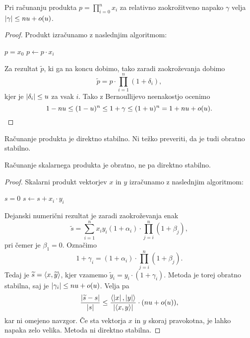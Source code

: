 \begin{trditev}
Pri računanju produkta $p = \prod_{i=0}^n x_i$ za relativno
zaokrožitveno napako $\gamma$ velja $\left\lvert \gamma\right\rvert \leq nu + o(u)$.
\end{trditev}

\begin{proof}
Produkt izračunamo z naslednjim algoritmom:
\begin{algorithmic}[1]
\State $p = x_0$
  \State $p \gets p \cdot x_i$
\EndFor
\end{algorithmic}
Za rezultat $\widetilde{p}$, ki ga na koncu dobimo, tako zaradi
zaokroževanja dobimo
\[
\widetilde{p} = p \cdot \prod_{i=1}^n (1+\delta_i),
\]
kjer je $\left\lvert \delta_i\right\rvert \leq u$ za vsak $i$. Tako z Bernoullijevo
neenakostjo ocenimo
\[
1 - nu \leq (1-u)^n \leq 1 + \gamma \leq (1+u)^n = 1 + nu + o(u).
\qedhere
\]
\end{proof}

\begin{opomba}
Računanje produkta je direktno stabilno. Ni težko preveriti, da je
tudi obratno stabilno.
\end{opomba}

\begin{trditev}
Računanje skalarnega produkta je obratno, ne pa direktno stabilno.
\end{trditev}

\begin{proof}
Skalarni produkt vektorjev $x$ in $y$ izračunamo z naslednjim
algoritmom:
\begin{algorithmic}[1]
\State $s = 0$
  \State $s \gets s + x_i \cdot y_i$
\EndFor
\end{algorithmic}
Dejanski numerični rezultat je zaradi zaokroževanja enak
\[
\widetilde{s} = \sum_{i=1}^n x_i y_i (1 + \alpha_i) \cdot
\prod_{j=i}^n (1 + \beta_j),
\]
pri čemer je $\beta_1 = 0$. Označimo
\[
1 + \gamma_i = (1 + \alpha_i) \cdot \prod_{j=i}^n (1 + \beta_j).
\]
Tedaj je $\widetilde{s} = \left\langle x, \widetilde{y}\right\rangle$, kjer vzamemo
$\widetilde{y}_i = y_i \cdot (1 + \gamma_i)$. Metoda je torej
obratno stabilna, saj je $\left\lvert \gamma_i\right\rvert \leq nu + o(u)$. Velja pa
\[
\frac{\left\lvert \widetilde{s} - s\right\rvert}{\left\lvert s\right\rvert} \leq
\frac{\left\langle \left\lvert x\right\rvert, \left\lvert y\right\rvert\right\rangle}{\left\lvert \left\langle x,y\right\rangle\right\rvert} \cdot (nu + o(u)),
\]
kar ni omejeno navzgor. Če sta vektorja $x$ in $y$ skoraj
pravokotna, je lahko napaka zelo velika. Metoda ni direktno
stabilna.
\end{proof}
